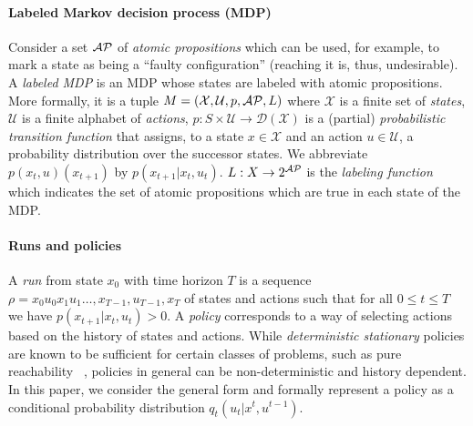 \paragraph*{Labeled Markov decision process (MDP)} Consider a set $\mathcal{AP}$ of \emph{atomic propositions} which can be used, for example, to mark a state as being a ``faulty configuration'' (reaching it is, thus, undesirable). A \emph{labeled MDP} is an MDP whose states are labeled with atomic propositions. More formally, it is a tuple $M=(\mathcal{X},\mathcal{U},p,\mathcal{AP},L)$ where $\mathcal{X}$ is a
	finite set of \emph{states},
	$\mathcal{U}$ is a finite alphabet of \emph{actions},
	$p: S\times\mathcal{U} \to \mathcal{D}({\mathcal{X}})$ is a (partial) \emph{probabilistic
	transition function} that assigns, to a state $x\in \mathcal{X}$ and an action $u \in
	\mathcal{U}$, a probability distribution over the successor states. We
	abbreviate $p(x_{t},u)(x_{t+1})$ by $p(x_{t+1}|x_t,u_t)$.
$L : X \rightarrow 2^{\mathcal{AP}}$ is the \emph{labeling function} which indicates the set of atomic propositions which are true in each state of the MDP.
\paragraph*{Runs and policies}
A \emph{run} from state $x_0$ with time horizon $T$ is a sequence $\rho = x_0 u_0 x_1 u_1 \dots ,x_{T-1},u_{T-1},x_{T}$ of states and actions such that for all $0 \leq t\leq T$ we have $p(x_{t+1}|x_t,u_t)>0$. 
%
A \emph{policy} corresponds to a way of selecting actions based on the history
of states and actions. While \emph{deterministic stationary} policies
are known to be sufficient for certain classes of problems, such as pure reachability ~\cite{puterman2014}, policies in general can be non-deterministic and history dependent. In this paper, we consider the general form and formally represent a policy as a conditional probability distribution $q_t(u_t|x^t,u^{t-1})$. 

